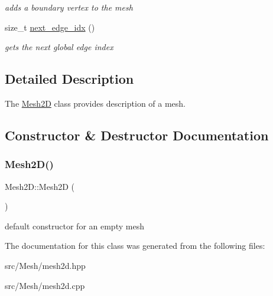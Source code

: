 \begin{DoxyCompactItemize}
\begin{DoxyCompactList}\small\item\em adds a boundary vertex to the mesh \end{DoxyCompactList}\item 
size\+\_\+t \hyperlink{group__Mesh2D_gaceaccf9dfd1f3ef70c597bb79934d2cf}{next\+\_\+edge\+\_\+idx} ()
\begin{DoxyCompactList}\small\item\em gets the next global edge index \end{DoxyCompactList}\end{DoxyCompactItemize}


\subsection{Detailed Description}
The \hyperlink{classHCore2D_1_1Mesh2D}{Mesh2D} class provides description of a mesh. 

\subsection{Constructor \& Destructor Documentation}
\mbox{\label{classHCore2D_1_1Mesh2D_a04b6cd67a13e59ec44be0b19739610e7}} 
\subsubsection{\texorpdfstring{Mesh2\+D()}{Mesh2D()}}
{\footnotesize\ttfamily Mesh2\+D\+::\+Mesh2D (\begin{DoxyParamCaption}{ }\end{DoxyParamCaption})}

default constructor for an empty mesh 

The documentation for this class was generated from the following files\+:\begin{DoxyCompactItemize}
\item 
src/\+Mesh/mesh2d.\+hpp\item 
src/\+Mesh/mesh2d.\+cpp\end{DoxyCompactItemize}
